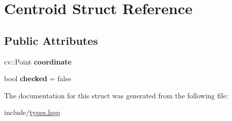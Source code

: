 \hypertarget{structCentroid}{}\section{Centroid Struct Reference}
\label{structCentroid}
\subsection*{Public Attributes}
\begin{DoxyCompactItemize}
\item 
\mbox{\label{structCentroid_a18d170e7447e5cddecce8f5b968edabe}} 
cv\+::\+Point {\bfseries coordinate}
\item 
\mbox{\label{structCentroid_af95a475ff8d09da48857f20c709395cc}} 
bool {\bfseries checked} = false
\end{DoxyCompactItemize}


The documentation for this struct was generated from the following file\+:\begin{DoxyCompactItemize}
\item 
include/\hyperlink{types_8hpp}{types.\+hpp}\end{DoxyCompactItemize}
